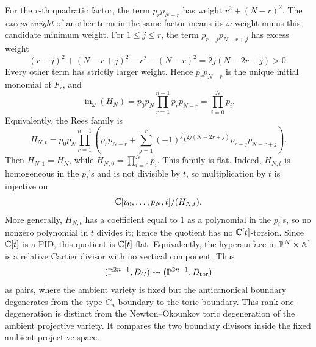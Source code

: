 For the \(r\)-th quadratic factor, the term \(p_rp_{N-r}\) has weight \(r^2+(N-r)^2\). The \emph{excess weight} of another term in the same factor means its \(\omega\)-weight minus this candidate minimum weight. For \(1\leq j\leq r\), the term \(p_{r-j}p_{N-r+j}\) has excess weight
\[
(r-j)^2+(N-r+j)^2-r^2-(N-r)^2=2j(N-2r+j)>0.
\]
Every other term has strictly larger weight. Hence \(p_rp_{N-r}\) is the unique initial monomial of \(F_r\), and
\[
\operatorname{in}_\omega(H_N)
=p_0p_N\prod_{r=1}^{n-1}p_rp_{N-r}
=\prod_{i=0}^Np_i.
\]
Equivalently, the Rees family is
\[
H_{N,t}=p_0p_N\prod_{r=1}^{n-1}
\left(p_rp_{N-r}+\sum_{j=1}^r(-1)^jt^{2j(N-2r+j)}p_{r-j}p_{N-r+j}\right).
\]
Then \(H_{N,1}=H_N\), while \(H_{N,0}=\prod_{i=0}^Np_i\). This family is flat. Indeed, \(H_{N,t}\) is homogeneous in the \(p_i\)'s and is not divisible by \(t\), so multiplication by \(t\) is injective on
\[
\mathbb{C}[p_0,\ldots,p_N,t]/(H_{N,t}).
\]
More generally, \(H_{N,t}\) has a coefficient equal to \(1\) as a polynomial in the \(p_i\)'s, so no nonzero polynomial in \(t\) divides it; hence the quotient has no \(\mathbb{C}[t]\)-torsion. Since \(\mathbb{C}[t]\) is a PID, this quotient is \(\mathbb{C}[t]\)-flat. Equivalently, the hypersurface in \(\mathbb{P}^N\times\mathbb A^1\) is a relative Cartier divisor with no vertical component. Thus
\[
(\mathbb{P}^{2n-1},D_C)
\rightsquigarrow
(\mathbb{P}^{2n-1},D_{\mathrm{tor}})
\]
as pairs, where the ambient variety is fixed but the anticanonical boundary degenerates from the type \(C_n\) boundary to the toric boundary.
This rank-one degeneration is distinct from the Newton--Okounkov toric degeneration of the ambient projective variety. It compares the two boundary divisors inside the fixed ambient projective space.
